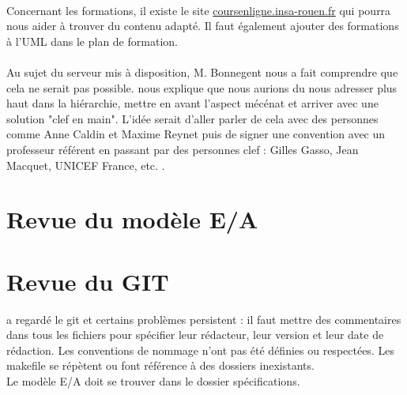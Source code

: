 \documentclass [a4paper] {article}
\begin{document}
\paragraph{}
Concernant les formations, il existe le site \url{coursenligne.insa-rouen.fr} qui pourra nous aider à trouver du contenu adapté. Il faut également ajouter des formations à l'UML dans le plan de formation.
\paragraph{}
Au sujet du serveur mis à disposition, M. Bonnegent nous a fait comprendre que cela ne serait pas possible. \nomTuteurPedago{} nous explique que nous aurions du nous adresser plus haut dans la hiérarchie, mettre en avant l'aspect mécénat et arriver avec une solution "clef en main". L'idée serait d'aller parler de cela avec des personnes comme Anne Caldin et Maxime Reynet puis de signer une convention avec un professeur référent en passant par des personnes clef : Gilles Gasso, Jean Macquet, UNICEF France, etc. .


\section{Revue du modèle E/A}



\section{Revue du GIT}
\nomTuteurPedago{} a regardé le git et certains problèmes persistent : il faut mettre des commentaires dans tous les fichiers pour spécifier leur rédacteur, leur version et leur date de rédaction. Les conventions de nommage n'ont pas été définies ou respectées. Les makefile se répètent ou font référence à des dossiers inexistants.
\\
Le modèle E/A doit se trouver dans le dossier spécifications.




\newpage
\end{document}
